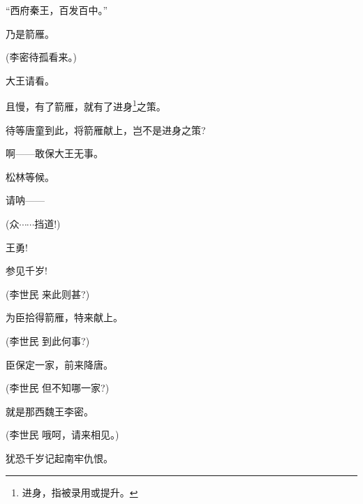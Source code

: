{







{``西府秦王，百发百中。''}

{乃是箭雁。}

{(李密\hspace{30pt}待孤看来。)}

{大王请看。}

{且慢，有了箭雁，就有了进身}\footnote{进身，指被录用或提升。}{之策。}

{待等唐童到此，将箭雁献上，岂不是进身之策?}

{啊------敢保大王无事。}

{松林等候。}

{请呐------}



{(众\hspace{40pt}$\cdots{}\cdots{}$挡道!)}

{王勇!}

{参见千岁!}

{(李世民 来此则甚?)}

{为臣拾得箭雁，特来献上。}

{(李世民 到此何事?)}

{臣保定一家，前来降唐。}

{(李世民 但不知哪一家?)}

{就是那西魏王李密。}

{(李世民 哦呵，请来相见。)}

{犹恐千岁记起南牢仇恨。}

}
